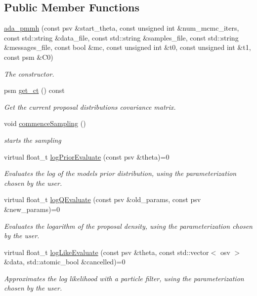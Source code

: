 \subsection*{Public Member Functions}
\begin{DoxyCompactItemize}
\item 
\hyperlink{classada__pmmh_a5ada0a36d005ab71ef337a8819268d31}{ada\+\_\+pmmh} (const psv \&start\+\_\+theta, const unsigned int \&num\+\_\+mcmc\+\_\+iters, const std\+::string \&data\+\_\+file, const std\+::string \&samples\+\_\+file, const std\+::string \&messages\+\_\+file, const bool \&mc, const unsigned int \&t0, const unsigned int \&t1, const psm \&C0)
\begin{DoxyCompactList}\small\item\em The constructor. \end{DoxyCompactList}\item 
psm \hyperlink{classada__pmmh_a1d496162b69f71e22a02ce7781a34228}{get\+\_\+ct} () const
\begin{DoxyCompactList}\small\item\em Get the current proposal distribution\textquotesingle{}s covariance matrix. \end{DoxyCompactList}\item 
\mbox{\label{classada__pmmh_a5f64ee5a581aaf8b967a181aa011cc2a}} 
void \hyperlink{classada__pmmh_a5f64ee5a581aaf8b967a181aa011cc2a}{commence\+Sampling} ()
\begin{DoxyCompactList}\small\item\em starts the sampling \end{DoxyCompactList}\item 
virtual float\+\_\+t \hyperlink{classada__pmmh_ae01d406468838916eb10956a26d346fb}{log\+Prior\+Evaluate} (const psv \&theta)=0
\begin{DoxyCompactList}\small\item\em Evaluates the log of the model\textquotesingle{}s prior distribution, using the parameterization chosen by the user. \end{DoxyCompactList}\item 
virtual float\+\_\+t \hyperlink{classada__pmmh_a5f0a24162f212e7f63a3d900f5d48a87}{log\+Q\+Evaluate} (const psv \&old\+\_\+params, const psv \&new\+\_\+params)=0
\begin{DoxyCompactList}\small\item\em Evaluates the logarithm of the proposal density, using the parameterization chosen by the user. \end{DoxyCompactList}\item 
virtual float\+\_\+t \hyperlink{classada__pmmh_ac6b216e8b940b9da7c835c91746cfc21}{log\+Like\+Evaluate} (const psv \&theta, const std\+::vector$<$ osv $>$ \&data, std\+::atomic\+\_\+bool \&cancelled)=0
\begin{DoxyCompactList}\small\item\em Approximates the log likelihood with a particle filter, using the parameterization chosen by the user. \end{DoxyCompactList}\end{DoxyCompactItemize}
